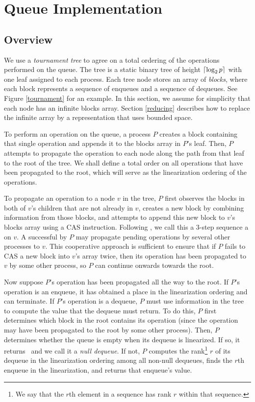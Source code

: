 
\section{Queue Implementation} \label{DescriptQ}

\subsection{Overview}
We use a \emph{tournament tree} to agree on a total ordering of the operations performed on the queue.
The tree is a static binary tree of height $\lceil \log_2 p \rceil$ with one leaf 
assigned to each process. 
Each tree node  stores an array of \emph{blocks}, where each block represents a 
sequence of enqueues and a sequence of dequeues.
See Figure \ref{tournament} for an example.
In this section, we assume for simplicity that each node has an infinite blocks array.
Section \ref{reducing} describes how to replace the infinite array by a representation that uses bounded space.


To perform an operation on the queue, a process $P$ creates a block containing that single 
operation and appends it to the blocks array in $P$'s leaf.
Then, $P$ attempts to propagate the operation to each node along the path from that leaf to the root of the tree.
We shall define a total order on all operations that have been propagated to the root, which 
will serve as the linearization ordering of the operations.

To propagate an operation to a node $v$ in the tree, $P$ first observes
the blocks in both of $v$'s children that are not already in $v$,
creates a new block by combining information from those blocks, and attempts to append this 
new block to $v$'s blocks array using a CAS instruction.
Following \cite{}, we call this a 3-step sequence a
 on $v$. %
A successful  by $P$ may propagate pending operations by several other processes to $v$.
This cooperative approach is sufficient to ensure that if $P$ fails to CAS a 
new block into $v$'s array twice,
then its operation has been propagated to $v$ by some other process, so $P$ can continue 
onwards towards the root.

Now suppose $P$'s operation has been propagated all the way to the root.
If $P$'s operation is an enqueue, it has obtained a place in the linearization ordering and can terminate.
If $P$'s operation is a dequeue, $P$ must use information in the tree to compute the value that the
dequeue must return.  To do this, $P$ first determines which block in the root contains its operation
(since the operation may have been propagated to the root by some other process).
Then, $P$ determines whether the queue is empty when its dequeue is linearized. 
If so, it returns \nl\ and we call it a \emph{null dequeue}.
If not, $P$ computes the rank\footnote{We say that the $r$th element in a sequence has rank $r$ within that sequence.} $r$ of its dequeue in the linearization ordering
among all non-null dequeues,
finds the $r$th enqueue in the linearization, and returns that enqueue's value.

